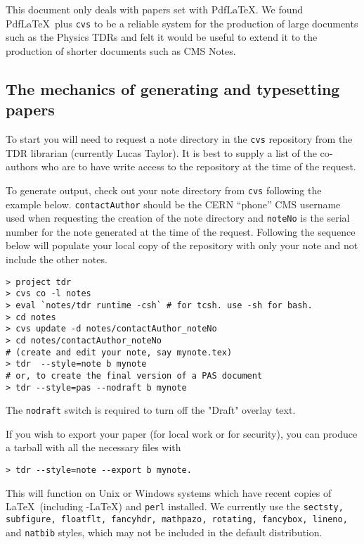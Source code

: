 This document only deals with papers set with Pdf\LaTeX. We found Pdf\LaTeX\ plus \texttt{cvs} to be a reliable system for the production of
large documents such as the Physics TDRs and felt it would be useful to extend it to the production of shorter documents such as CMS Notes.

\subsection{The mechanics of generating and typesetting papers}

To start
you will need to request a note directory in the \texttt{cvs} repository from the TDR librarian (currently
Lucas Taylor). It is best to supply a list of the co-authors who are to have write access to the repository at the time of the request.

To generate output, check out your note
directory from \texttt{cvs} following the example below. \texttt{contactAuthor} should be the CERN ``phone'' CMS username used when requesting the creation of the note directory and \texttt{noteNo} is
the serial number for the note generated at the time of the request. Following the sequence below will populate your local copy of the repository  with only your note and not include the other notes.

\begin{verbatim}
> project tdr
> cvs co -l notes
> eval `notes/tdr runtime -csh` # for tcsh. use -sh for bash.
> cd notes
> cvs update -d notes/contactAuthor_noteNo
> cd notes/contactAuthor_noteNo
# (create and edit your note, say mynote.tex)
> tdr  --style=note b mynote
# or, to create the final version of a PAS document
> tdr --style=pas --nodraft b mynote
\end{verbatim}

The \texttt{nodraft} switch is required to turn off the "Draft" overlay text.

If you wish to export your paper (for local work or for security), you can produce a tarball with all the necessary files with
\begin{verbatim}
> tdr --style=note --export b mynote.
\end{verbatim}
This will function on  Unix or Windows systems which have recent copies of \LaTeX\ (including \AmS-\LaTeX) and \texttt{perl} installed. We currently use the \texttt{sectsty, subfigure, floatflt,
fancyhdr, mathpazo, rotating, fancybox, lineno,} and \texttt{natbib} styles, which may not be included in the default distribution.


